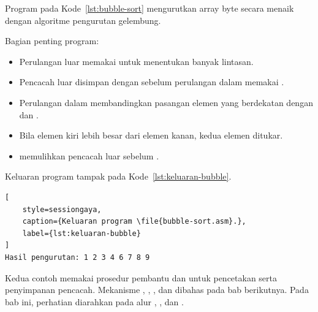 Program pada Kode~\ref{lst:bubble-sort} mengurutkan array byte
secara menaik dengan algoritme pengurutan gelembung.



Bagian penting program:

\begin{itemize}
    \item Perulangan luar memakai  untuk menentukan banyak
          lintasan.
    \item Pencacah luar disimpan dengan  sebelum
          perulangan dalam memakai .
    \item Perulangan dalam membandingkan pasangan elemen yang
          berdekatan dengan  dan .
    \item Bila elemen kiri lebih besar dari elemen kanan, kedua elemen
          ditukar.
    \item {} memulihkan pencacah luar sebelum
          .
\end{itemize}

Keluaran program tampak pada Kode~\ref{lst:keluaran-bubble}.

\begin{lstlisting}[
    style=sessiongaya,
    caption={Keluaran program \file{bubble-sort.asm}.},
    label={lst:keluaran-bubble}
]
Hasil pengurutan: 1 2 3 4 6 7 8 9
\end{lstlisting}

\begin{infobox}
\vspace{1.1em}
Kedua contoh memakai prosedur pembantu dan  untuk
pencetakan serta penyimpanan pencacah. Mekanisme ,
, , dan  dibahas pada bab berikutnya.
Pada bab ini, perhatian diarahkan pada alur , ,
dan .
\end{infobox}
